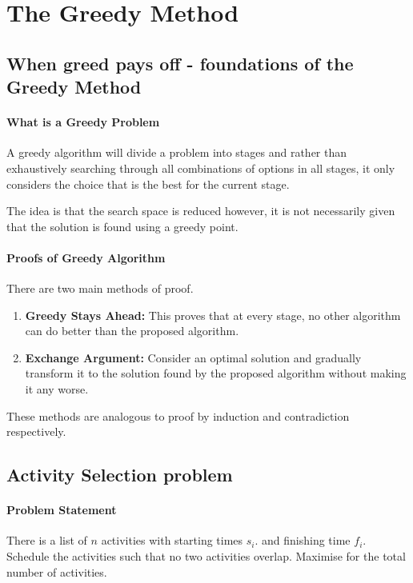 
\section{The Greedy Method}

\subsection{When greed pays off - foundations of the Greedy Method}

\paragraph{What is a Greedy Problem}
A greedy algorithm will divide a problem into stages and rather than exhaustively
searching through all combinations of options in all stages, it only
considers the choice that is the best for the current stage.

The idea is that the search space is reduced however, it is not
necessarily given that the solution is found using a greedy point.

\paragraph{Proofs of Greedy Algorithm}
There are two main methods of proof.
\begin{enumerate}
    \item \textbf{Greedy Stays Ahead:} This proves that at every stage,
    no other algorithm can do better than the proposed algorithm.
    \item \textbf{Exchange Argument:} Consider an optimal solution and
    gradually transform it to the solution found by the proposed algorithm
    without making it any worse.
\end{enumerate}
These methods are analogous to proof by induction and contradiction
respectively.

\subsection{Activity Selection problem}
\paragraph{Problem Statement}
There is a list of \(n\) activities with starting times \(s_i\).
and finishing time \(f_i\). Schedule the activities such that no two
activities overlap. Maximise for the total number of activities.

